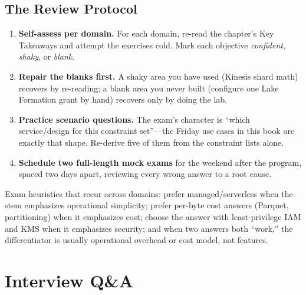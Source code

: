 \subsection{The Review Protocol}
\begin{enumerate}
    \item \textbf{Self-assess per domain.} For each domain, re-read the chapter's Key Takeaways and attempt the exercises cold. Mark each objective \emph{confident}, \emph{shaky}, or \emph{blank}.
    \item \textbf{Repair the blanks first.} A shaky area you have used (Kinesis shard math) recovers by re-reading; a blank area you never built (configure one Lake Formation grant by hand) recovers only by doing the lab.
    \item \textbf{Practice scenario questions.} The exam's character is ``which service/design for this constraint set''---the Friday use cases in this book are exactly that shape. Re-derive five of them from the constraint lists alone.
    \item \textbf{Schedule two full-length mock exams} for the weekend after the program, spaced two days apart, reviewing every wrong answer to a root cause.
\end{enumerate}

\begin{tipbox}
Exam heuristics that recur across domains: prefer managed/serverless when the stem emphasizes operational simplicity; prefer per-byte cost answers (Parquet, partitioning) when it emphasizes cost; choose the answer with least-privilege IAM and KMS when it emphasizes security; and when two answers both ``work,'' the differentiator is usually operational overhead or cost model, not features.
\end{tipbox}

\section{Interview Q\&A}
